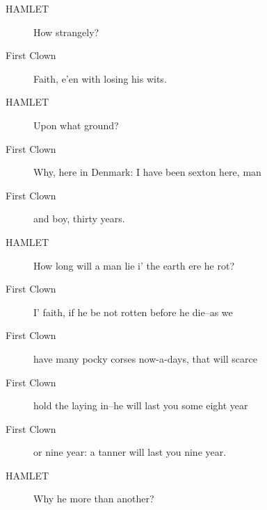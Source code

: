 \documentclass{article}
\begin{document}
\begin{description}
            
\item[HAMLET] How strangely?
\end{description}
          
\begin{description}
            
\item[First Clown] Faith, e'en with losing his wits.
\end{description}
          
\begin{description}
            
\item[HAMLET] Upon what ground?
\end{description}
          
\begin{description}
            
\item[First Clown] Why, here in Denmark: I have been sexton here, man
\item[First Clown] and boy, thirty years.
\end{description}
          
\begin{description}
            
\item[HAMLET] How long will a man lie i' the earth ere he rot?
\end{description}
          
\begin{description}
            
\item[First Clown] I' faith, if he be not rotten before he die--as we
\item[First Clown] have many pocky corses now-a-days, that will scarce
\item[First Clown] hold the laying in--he will last you some eight year
\item[First Clown] or nine year: a tanner will last you nine year.
\end{description}
          
\begin{description}
            
\item[HAMLET] Why he more than another?
\end{description}
          
\end{document}
